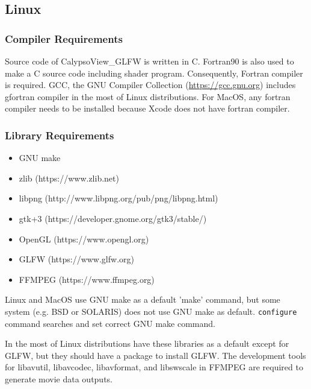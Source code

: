 \subsection{Linux}
\subsubsection{Compiler Requirements}
Source code of CalypsoView\_GLFW is written in C. Fortran90 is also used to make a C source code including shader program. Consequently, Fortran compiler is required. GCC, the GNU Compiler Collection (\url{https://gcc.gnu.org}) includes gfortran compiler in the most of Linux distributions. For MacOS, any fortran compiler needs to be installed because Xcode does not have fortran compiler.

\subsubsection{Library Requirements}
\label{sec:requirements}
\begin{itemize}
\item GNU make
\item zlib (https://www.zlib.net)
\item libpng (http://www.libpng.org/pub/png/libpng.html)
\item gtk+3  (https://developer.gnome.org/gtk3/stable/)
\item OpenGL (https://www.opengl.org)
\item GLFW   (https://www.glfw.org)
\item FFMPEG (https://www.ffmpeg.org)
\end{itemize}
Linux and MacOS use GNU make as a default 'make' command, but some system (e.g. BSD or SOLARIS) does not use GNU make as default. \verb|configure| command searches and set correct GNU make command.

In the most of Linux distributions have these libraries as a default except for {\color{red} GLFW}, but they should have a package to install GLFW. The development tools for libavutil, libavcodec, libavformat, and libswscale in FFMPEG are required to generate movie data outputs.

